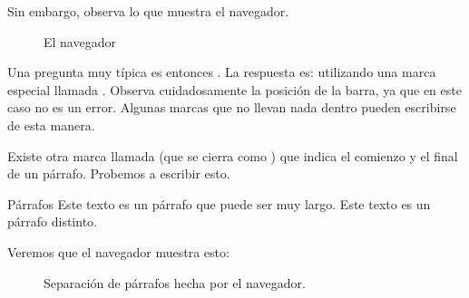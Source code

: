 \documentclass[a4paper,12pt,spanish]{sphinxmanual}
\begin{document}
Sin embargo, observa lo que muestra el navegador.

\begin{figure}[htbp]
\centering
\capstart

\noindent{}
\caption{El navegador }\label{\detokenize{index:id9}}\end{figure}

Una pregunta muy típica es entonces . La respuesta es: utilizando una marca especial llamada . Observa cuidadosamente la posición de la barra, ya que en este caso no es un error. Algunas marcas que no llevan nada dentro pueden escribirse de esta manera.

Existe otra marca llamada  (que se cierra como ) que indica el comienzo y el final de un párrafo. Probemos a escribir esto.

%
\begin{sphinxVerbatim}[commandchars=\\\{\}]
      Párrafos  
      Este texto es un párrafo que puede ser muy largo. 
      Este texto es un párrafo distinto. 
\end{sphinxVerbatim}

Veremos que el navegador muestra esto:

\begin{figure}[htbp]
\centering
\capstart

\noindent{}
\caption{Separación de párrafos hecha por el navegador.}\label{\detokenize{index:id10}}\end{figure}



\renewcommand{\indexname}{Índice}
\printindex
\end{document}
